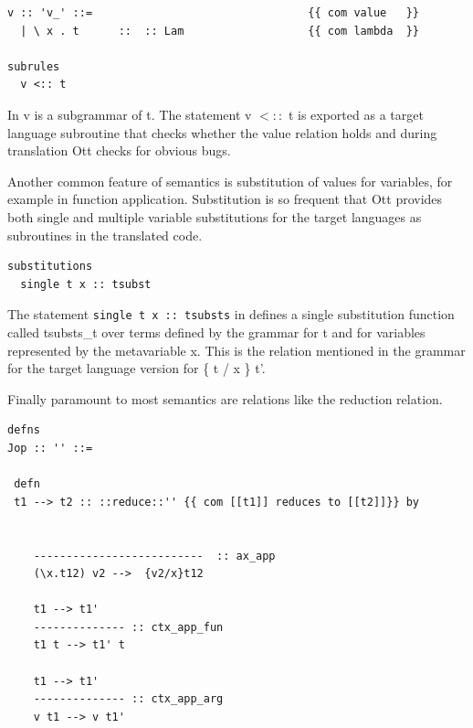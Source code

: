 \documentclass[12pt,twoside,notitlepage]{report}
\begin{document}
\begin{lstlisting}[language={Ott}, caption={Ott value subgrammar example}, label={lst:ottvaluesubgrammarexample}]
v :: 'v_' ::=                                 {{ com value   }}
  | \ x . t      ::  :: Lam                   {{ com lambda  }}
  
subrules
  v <:: t
\end{lstlisting}

In  v is a subgrammar of t. The statement v $<::$ t is exported as a target language subroutine that checks whether the value relation holds and during translation Ott checks for obvious bugs.

Another common feature of semantics is substitution of values for variables, for example in function application. Substitution is so frequent that Ott provides both single and multiple variable substitutions for the target languages as subroutines in the translated code.


\vspace{3mm}

\begin{minipage}{\linewidth}

\begin{lstlisting}[language={Ott}, caption={Ott substitution example}, label={lst:ottsubstex}]
substitutions
  single t x :: tsubst 
\end{lstlisting}

\end{minipage}


The statement \lstinline[language={Ott}]|single t x :: tsubsts| in  defines a single substitution function called tsubsts\_t over terms defined by the grammar for t and for variables represented by the metavariable x. This is the relation mentioned in the grammar for the target language version for \{ t / x \} t'.



Finally paramount to most semantics are relations like the reduction relation.


\begin{minipage}{\linewidth}
\begin{lstlisting}[language={Ott}, caption={Ott reduction relation example}, label={lst:ottredex}]
defns
Jop :: '' ::=

 defn
 t1 --> t2 :: ::reduce::'' {{ com [[t1]] reduces to [[t2]]}} by


    --------------------------  :: ax_app
    (\x.t12) v2 -->  {v2/x}t12

    t1 --> t1'
    -------------- :: ctx_app_fun
    t1 t --> t1' t

    t1 --> t1'
    -------------- :: ctx_app_arg
    v t1 --> v t1'
\end{lstlisting}
\end{minipage}
\end{document}
